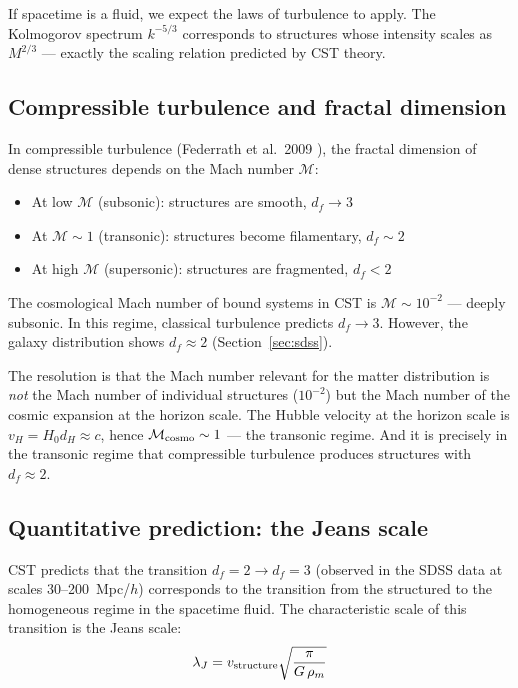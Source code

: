 \documentclass[10pt,a4paper]{article}
\begin{document}
If spacetime is a fluid, we expect the laws of turbulence to apply. The Kolmogorov spectrum $k^{-5/3}$ corresponds to structures whose intensity scales as $M^{2/3}$ --- exactly the scaling relation predicted by CST theory.

\subsection{Compressible turbulence and fractal dimension}

In compressible turbulence (Federrath et al.\ 2009 \cite{Federrath2009}), the fractal dimension of dense structures depends on the Mach number $\mathcal{M}$:
\begin{itemize}
\item At low $\mathcal{M}$ (subsonic): structures are smooth, $d_f \to 3$
\item At $\mathcal{M} \sim 1$ (transonic): structures become filamentary, $d_f \sim 2$
\item At high $\mathcal{M}$ (supersonic): structures are fragmented, $d_f < 2$
\end{itemize}

The cosmological Mach number of bound systems in CST is $\mathcal{M} \sim 10^{-2}$ --- deeply subsonic. In this regime, classical turbulence predicts $d_f \to 3$. However, the galaxy distribution shows $d_f \approx 2$ (Section~\ref{sec:sdss}).

The resolution is that the Mach number relevant for the matter distribution is \textit{not} the Mach number of individual structures ($10^{-2}$) but the Mach number of the cosmic expansion at the horizon scale. The Hubble velocity at the horizon scale is $v_H = H_0 d_H \approx c$, hence $\mathcal{M}_{\rm cosmo} \sim 1$ --- the transonic regime. And it is precisely in the transonic regime that compressible turbulence produces structures with $d_f \approx 2$.

\subsection{Quantitative prediction: the Jeans scale}

CST predicts that the transition $d_f = 2 \to d_f = 3$ (observed in the SDSS data at scales 30--200~Mpc/$h$) corresponds to the transition from the structured to the homogeneous regime in the spacetime fluid. The characteristic scale of this transition is the Jeans scale:
\begin{equation}
\lambda_J = v_{\rm structure} \sqrt{\frac{\pi}{G\,\rho_m}}
\end{equation}
\end{document}
